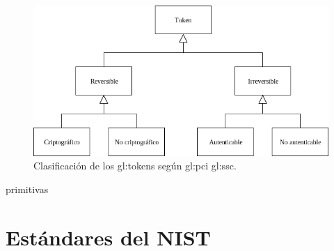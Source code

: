 \begin{figure}[h]
  \begin{center}
    \includegraphics[width=0.75\linewidth]
      {../../../../diagramas_comunes/clasificacion/clasificacion.png}
    \caption{Clasificación de los \glspl{gl:token}
      según \gls{gl:pci} \gls{gl:ssc}.}
    \label{fig:division_tokens}
  \end{center}
\end{figure}

{primitivas}

\section{Estándares del NIST}

